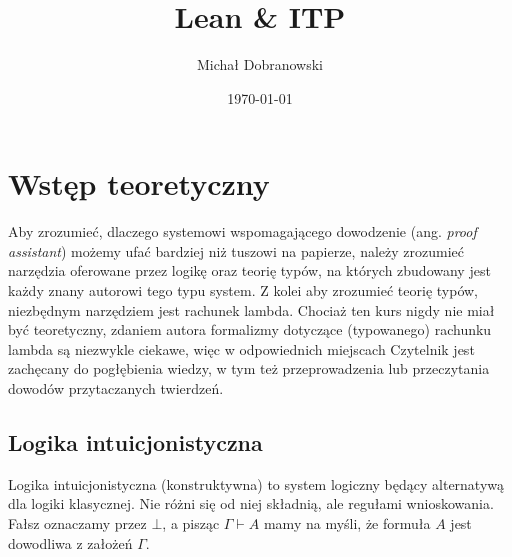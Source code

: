 \documentclass[polish,pretty]{angav}
\title{Lean \& ITP}
\author{Michał Dobranowski}
\date{\today}
\begin{document}
\maketitle
\tableofcontents
\newpage

\section{Wstęp teoretyczny}

Aby zrozumieć, dlaczego systemowi wspomagającego dowodzenie (ang. \textit{proof assistant}) możemy ufać bardziej niż tuszowi na papierze, należy zrozumieć narzędzia oferowane przez logikę oraz teorię typów, na których zbudowany jest każdy znany autorowi tego typu system.
Z kolei aby zrozumieć teorię typów, niezbędnym narzędziem jest rachunek lambda.
Chociaż ten kurs nigdy nie miał być teoretyczny, zdaniem autora formalizmy dotyczące (typowanego) rachunku lambda są niezwykle ciekawe, więc w odpowiednich miejscach Czytelnik jest zachęcany do pogłębienia wiedzy, w tym też przeprowadzenia lub przeczytania dowodów przytaczanych twierdzeń.

\subsection{Logika intuicjonistyczna}

Logika intuicjonistyczna (konstruktywna) to system logiczny będący alternatywą dla logiki klasycznej. Nie różni się od niej składnią, ale regułami wnioskowania. Fałsz oznaczamy przez $\bot$, a pisząc $\Gamma \vdash A$ mamy na myśli, że formuła $A$ jest dowodliwa z założeń $\Gamma$.
\end{document}
